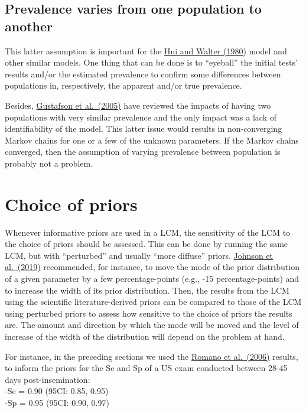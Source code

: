 \documentclass[
]{book}
\begin{document}
\subsection{Prevalence varies from one population to another}\label{prevalence-varies-from-one-population-to-another}

This latter assumption is important for the \href{https://www.jstor.org/stable/2530508?seq=1}{Hui and Walter (1980)} model and other similar models. One thing that can be done is to ``eyeball'' the initial tests' results and/or the estimated prevalence to confirm some differences between populations in, respectively, the apparent and/or true prevalence.

Besides, \href{https://projecteuclid.org/journals/statistical-science/volume-20/issue-2/On-Model-Expansion-Model-Contraction-Identifiability-and-Prior-Information/10.1214/088342305000000098.full}{Gustafson et al.~(2005)} have reviewed the impacts of having two populations with very similar prevalence and the only impact was a lack of identifiability of the model. This latter issue would results in non-converging Markov chains for one or a few of the unknown parameters. If the Markov chains converged, then the assumption of varying prevalence between population is probably not a problem.

\section{Choice of priors}\label{choice-of-priors}

Whenever informative priors are used in a LCM, the sensitivity of the LCM to the choice of priors should be assessed. This can be done by running the same LCM, but with ``perturbed'' and usually ``more diffuse'' priors. \href{https://doi.org/10.1016/j.prevetmed.2019.01.010}{Johnson et al.~(2019)} recommended, for instance, to move the mode of the prior distribution of a given parameter by a few percentage-points (e.g., -15 percentage-points) and to increase the width of its prior distribution. Then, the results from the LCM using the scientific literature-derived priors can be compared to those of the LCM using perturbed priors to assess how sensitive to the choice of priors the results are. The amount and direction by which the mode will be moved and the level of increase of the width of the distribution will depend on the problem at hand.

For instance, in the preceding sections we used the \href{https://www.sciencedirect.com/science/article/pii/S0093691X06001543?via\%3Dihub}{Romano et al.~(2006)} results, to inform the priors for the Se and Sp of a US exam conducted between 28-45 days post-insemination:\\
-Se = 0.90 (95CI: 0.85, 0.95)\\
-Sp = 0.95 (95CI: 0.90, 0.97)
\end{document}
